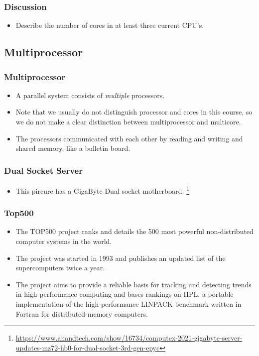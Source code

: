 \documentclass{beamer}
\begin{document}
\begin{CJK}{UTF8}{bsmi}
  \begin{frame}
    \frametitle{Discussion} 
    \begin{itemize}
    \item Describe the number of cores in at least three current CPU's.
    \end{itemize}
  \end{frame}


  \subsection{Multiprocessor}

  \begin{frame}
    \frametitle{Multiprocessor} 
    \begin{itemize}
    \item A parallel system consists of {\em multiple} processors.
    \item Note that we usually do not distinguish processor and cores in this course, so we do not make a clear distinction between multiprocessor and multicore.
    \item The processors communicated with each other by reading and writing and shared memory, like a bulletin board.
    \end{itemize}
  \end{frame}

  \begin{frame}
    \frametitle{Dual Socket Server}
    \begin{itemize}
    \item This pircure has a GigaByte Dual socket motherboard.
      \footnote{\url{https://www.anandtech.com/show/16734/computex-2021-gigabyte-server-updates-mz72-hb0-for-dual-socket-3rd-gen-epyc}}
    \end{itemize}
    \centerline{}
  \end{frame}




  \begin{frame}
    \frametitle{Top500}
    \begin{itemize}
    \item The TOP500 project ranks and details the 500 most powerful
      non-distributed computer systems in the world.
    \item The project was started in 1993 and publishes an updated list of
      the supercomputers twice a year.
    \item The project aims to provide a reliable basis for tracking and
      detecting trends in high-performance computing and bases rankings on
      HPL, a portable implementation of the high-performance LINPACK
      benchmark written in Fortran for distributed-memory computers.
    \end{itemize}
  \end{frame}


\end{CJK}
\end{document}
